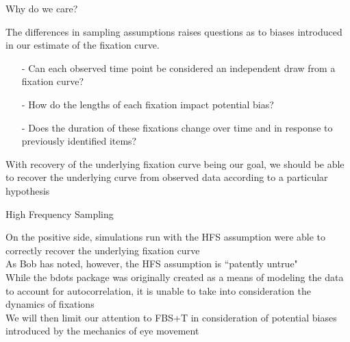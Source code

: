 \documentclass{beamer}
\begin{document}
\begin{frame}{Why do we care?}

The differences in sampling assumptions raises questions as to biases introduced in our estimate of the fixation curve. \newline

\begin{itemize}
  \item[-] Can each observed time point be considered an independent draw from a fixation curve?
  \item[-] How do the lengths of each fixation impact potential bias?
  \item[-] Does the duration of these fixations change over time and in response to previously identified items?
\end{itemize}

\vspace{4mm}

With recovery of the underlying fixation curve being our goal, we should be able to recover the underlying curve from observed data according to a particular hypothesis \newline 

\end{frame}

\begin{frame}{High Frequency Sampling}

On the positive side, simulations run with the HFS assumption were able to correctly recover the underlying fixation curve \newline \\

As Bob has noted, however, the HFS assumption is ``patently untrue" \newline \\

While the bdots package was originally created as a means of modeling the data to account for autocorrelation, it is unable to take into consideration the dynamics of fixations \newline \\


We will then limit our attention to FBS+T in consideration of potential biases introduced by the mechanics of eye movement

\end{frame}
\end{document}
